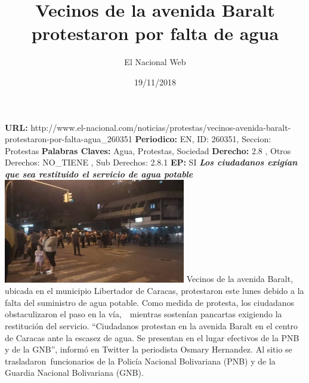 \documentclass{article}%
\title{\textbf{Vecinos de la avenida Baralt protestaron por falta de agua}}%
\author{El Nacional Web}%
\date{19/11/2018}%
\begin{document}
%
\normalsize%
\maketitle%
\textbf{URL: }%
http://www.el{-}nacional.com/noticias/protestas/vecinos{-}avenida{-}baralt{-}protestaron{-}por{-}falta{-}agua\_260351\newline%
%
\textbf{Periodico: }%
EN, %
ID: %
260351, %
Seccion: %
Protestas\newline%
%
\textbf{Palabras Claves: }%
Agua, Protestas, Sociedad\newline%
%
\textbf{Derecho: }%
2.8%
, Otros Derechos: %
NO\_TIENE%
, Sub Derechos: %
2.8.1%
\newline%
%
\textbf{EP: }%
SI\newline%
\newline%
%
\textbf{\textit{Los ciudadanos exigían que sea restituido el servicio de agua potable}}%
\newline%
\newline%
%
\includegraphics[width=300px]{35.jpg}%
\newline%
%
Vecinos de la avenida Baralt, ubicada en el municipio Libertador de Caracas, protestaron este lunes debido a la falta del suministro de agua potable.%
\newline%
%
Como medida de protesta, los ciudadanos obstaculizaron el paso en la vía,~~mientras sostenían pancartas exigiendo la restitución del servicio.%
\newline%
%
“Ciudadanos protestan en la avenida Baralt en el centro de Caracas ante la escasez de agua. Se presentan en el lugar efectivos de la PNB y de la GNB”, informó en Twitter la periodista Osmary Hernandez.%
\newline%
%
Al sitio se trasladaron~funcionarios de la Policía Nacional Bolivariana (PNB) y de la Guardia Nacional Bolivariana (GNB).%
\newline%
%
\end{document}
